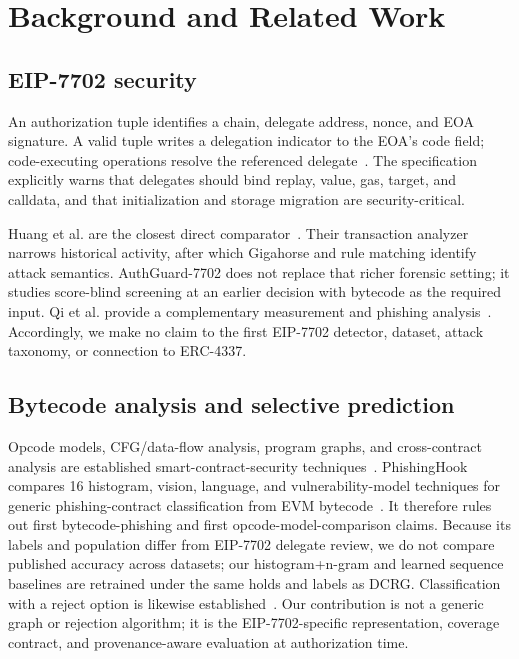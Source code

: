 \documentclass[conference]{IEEEtran}
\begin{document}
\section{Background and Related Work}

\subsection{EIP-7702 security}

An authorization tuple identifies a chain, delegate address, nonce, and EOA signature. A valid
tuple writes a delegation indicator to the EOA's code field; code-executing operations resolve the
referenced delegate~\cite{eip7702}. The specification explicitly warns that delegates should bind
replay, value, gas, target, and calldata, and that initialization and storage migration are
security-critical.

Huang et al. are the closest direct comparator~\cite{huang2026darkside}. Their transaction analyzer
narrows historical activity, after which Gigahorse and rule matching identify attack semantics.
AuthGuard-7702 does not replace that richer forensic setting; it studies score-blind screening at an
earlier decision with bytecode as the required input. Qi et al. provide a complementary measurement
and phishing analysis~\cite{qi2025phishing}. Accordingly, we make no claim to the first EIP-7702
detector, dataset, attack taxonomy, or connection to ERC-4337.

\subsection{Bytecode analysis and selective prediction}

Opcode models, CFG/data-flow analysis, program graphs, and cross-contract analysis are established
smart-contract-security techniques~\cite{gigahorse,eth2vec}. PhishingHook compares 16 histogram,
vision, language, and vulnerability-model techniques for generic phishing-contract classification
from EVM bytecode~\cite{phishinghook}. It therefore rules out first bytecode-phishing and first
opcode-model-comparison claims. Because its labels and population differ from EIP-7702 delegate
review, we do not compare published accuracy across datasets; our histogram+n-gram and learned
sequence baselines are retrained under the same holds and labels as DCRG. Classification with a
reject option is likewise established~\cite{selectivenet}. Our contribution is not a generic graph
or rejection algorithm; it is the EIP-7702-specific representation, coverage contract, and
provenance-aware evaluation at authorization time.
\end{document}
